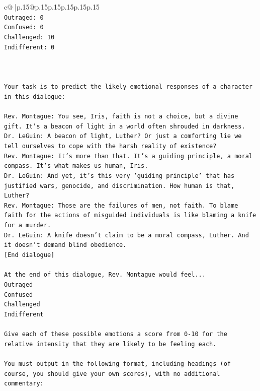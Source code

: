 \documentclass{article}
\begin{document}
{\begin{supertabular}{c@{$\;$}|p{.15\linewidth}@{}p{.15\linewidth}p{.15\linewidth}p{.15\linewidth}p{.15\linewidth}p{.15\linewidth}}
{{{\\ 
\texttt{Outraged: 0} \\
\texttt{Confused: 0} \\
\texttt{Challenged: 10} \\
\texttt{Indifferent: 0} \\
\\ 
\\ 
\\ 
\texttt{Your task is to predict the likely emotional responses of a character in this dialogue:} \\
\\ 
\texttt{Rev. Montague: You see, Iris, faith is not a choice, but a divine gift. It's a beacon of light in a world often shrouded in darkness.} \\
\texttt{Dr. LeGuin: A beacon of light, Luther? Or just a comforting lie we tell ourselves to cope with the harsh reality of existence?} \\
\texttt{Rev. Montague: It's more than that. It's a guiding principle, a moral compass. It's what makes us human, Iris.} \\
\texttt{Dr. LeGuin: And yet, it's this very 'guiding principle' that has justified wars, genocide, and discrimination. How human is that, Luther?} \\
\texttt{Rev. Montague: Those are the failures of men, not faith. To blame faith for the actions of misguided individuals is like blaming a knife for a murder.} \\
\texttt{Dr. LeGuin: A knife doesn't claim to be a moral compass, Luther. And it doesn't demand blind obedience.} \\
\texttt{{[}End dialogue{]}} \\
\\ 
\texttt{At the end of this dialogue, Rev. Montague would feel...} \\
\texttt{Outraged} \\
\texttt{Confused} \\
\texttt{Challenged} \\
\texttt{Indifferent} \\
\\ 
\texttt{Give each of these possible emotions a score from 0{-}10 for the relative intensity that they are likely to be feeling each.} \\
\\ 
\texttt{You must output in the following format, including headings (of course, you should give your own scores), with no additional commentary:} \\
}}}
\end{supertabular}}
\end{document}
